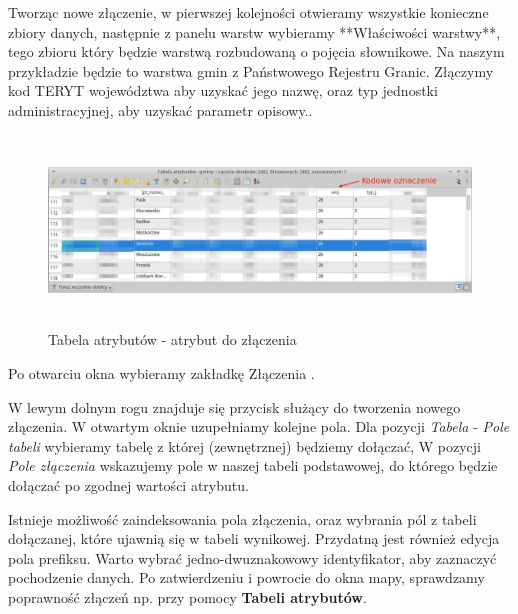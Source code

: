 \documentclass[12pt,a4paper]{book}
\begin{document}
Tworząc nowe złączenie, w pierwszej kolejności otwieramy wszystkie konieczne zbiory danych, następnie z panelu warstw wybieramy **Właściwości warstwy**, tego zbioru który będzie warstwą rozbudowaną o pojęcia słownikowe. Na naszym przykładzie będzie to warstwa gmin z Państwowego Rejestru Granic. Złączymy kod TERYT województwa aby uzyskać jego nazwę, oraz typ jednostki administracyjnej, aby uzyskać parametr opisowy.. 

\begin{center}
\begin{figure}
\includegraphics[width=17cm,height=5.059cm]{003-zlaczenia-atrybut.png}
\caption{Tabela atrybutów - atrybut do złączenia}
\end{figure}
\end{center}
Po otwarciu okna wybieramy zakładkę  Złączenia .

W lewym dolnym rogu znajduje się przycisk służący do tworzenia nowego złączenia. W otwartym oknie uzupełniamy kolejne pola. Dla pozycji \textit{Tabela} - \textit{Pole tabeli} wybieramy tabelę z której (zewnętrznej) będziemy dołączać, W pozycji \textit{Pole złączenia} wskazujemy pole w naszej tabeli podstawowej, do którego będzie dołączać po zgodnej wartości atrybutu.

Istnieje możliwość zaindeksowania pola złączenia, oraz wybrania pól z tabeli dołączanej, które ujawnią się w tabeli wynikowej. Przydatną jest również edycja pola prefiksu. Warto wybrać jedno-dwuznakowowy identyfikator, aby zaznaczyć pochodzenie danych. Po zatwierdzeniu i powrocie do okna mapy, sprawdzamy poprawność złączeń np. przy pomocy \textbf{Tabeli atrybutów}.
\end{document}

